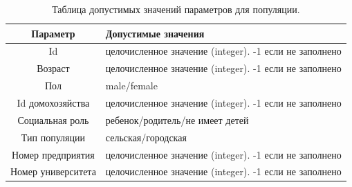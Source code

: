 \documentclass[14pt,a4paper]{article}
\begin{document}
\begin{table}[h]
	\centering
	\caption{Таблица допустимых значений параметров для популяции.}
	\begin{tabularx}{\textwidth}{|c|X|}
		\hline
		Параметр               & Допустимые значения                                         \\
		\hline
		Id                     & целочисленное значение (integer). -1 если не заполнено      \\
		Возраст                & целочисленное значение (integer). -1 если не заполнено      \\
		Пол                    & male/female                                                 \\
		Id домохозяйства       & целочисленное значение (integer). -1 если не заполнено      \\
		Социальная роль        & ребенок/родитель/не имеет детей                             \\
		Тип популяции          & сельская/городская                                                 \\
		Номер предприятия      & целочисленное значение (integer). -1 если не заполнено      \\
		Номер университета     & целочисленное значение (integer). -1 если не заполнено      \\
		\hline
	\end{tabularx}
	\label{fig:table_paremeters_population}
\end{table}


\end{document}
